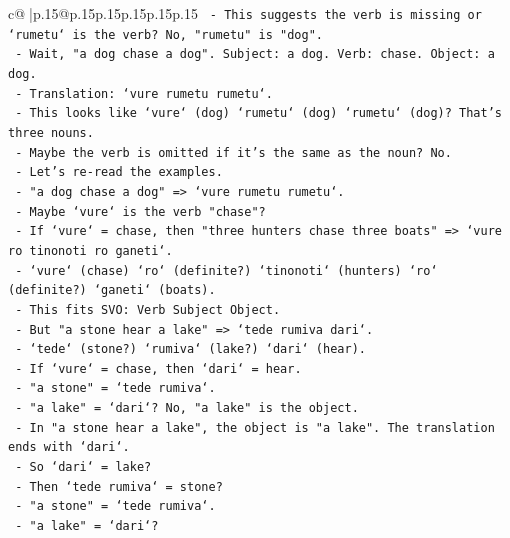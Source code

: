 \documentclass{article}
\begin{document}
{\begin{supertabular}{c@{$\;$}|p{.15\linewidth}@{}p{.15\linewidth}p{.15\linewidth}p{.15\linewidth}p{.15\linewidth}p{.15\linewidth}}
{{{\texttt{                     {-} This suggests the verb is missing or `rumetu` is the verb? No, "rumetu" is "dog".} \\
\texttt{                     {-} Wait, "a dog chase a dog". Subject: a dog. Verb: chase. Object: a dog.} \\
\texttt{                     {-} Translation: `vure rumetu rumetu`.} \\
\texttt{                     {-} This looks like `vure` (dog) `rumetu` (dog) `rumetu` (dog)? That's three nouns.} \\
\texttt{                     {-} Maybe the verb is omitted if it's the same as the noun? No.} \\
\texttt{                     {-} Let's re{-}read the examples.} \\
\texttt{                     {-} "a dog chase a dog" => `vure rumetu rumetu`.} \\
\texttt{                     {-} Maybe `vure` is the verb "chase"?} \\
\texttt{                     {-} If `vure` = chase, then "three hunters chase three boats" => `vure ro tinonoti ro ganeti`.} \\
\texttt{                       {-} `vure` (chase) `ro` (definite?) `tinonoti` (hunters) `ro` (definite?) `ganeti` (boats).} \\
\texttt{                       {-} This fits SVO: Verb Subject Object.} \\
\texttt{                       {-} But "a stone hear a lake" => `tede rumiva dari`.} \\
\texttt{                         {-} `tede` (stone?) `rumiva` (lake?) `dari` (hear).} \\
\texttt{                         {-} If `vure` = chase, then `dari` = hear.} \\
\texttt{                         {-} "a stone" = `tede rumiva`.} \\
\texttt{                         {-} "a lake" = `dari`? No, "a lake" is the object.} \\
\texttt{                         {-} In "a stone hear a lake", the object is "a lake". The translation ends with `dari`.} \\
\texttt{                         {-} So `dari` = lake?} \\
\texttt{                         {-} Then `tede rumiva` = stone?} \\
\texttt{                         {-} "a stone" = `tede rumiva`.} \\
\texttt{                         {-} "a lake" = `dari`?} \\
}}}
\end{supertabular}}
\end{document}
